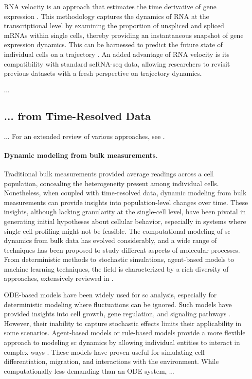 RNA velocity is an approach that estimates the time derivative of gene expression \citep{la2018rna}. This methodology captures the dynamics of RNA at the transcriptional level by examining the proportion of unspliced and spliced mRNAs within single cells, thereby providing an instantaneous snapshot of gene expression dynamics. This can be harnessed to predict the future state of individual cells on a trajectory \citep{bergen2020generalizing}. An added advantage of RNA velocity is its compatibility with standard scRNA-seq data, allowing researchers to revisit previous datasets with a fresh perspective on trajectory dynamics.

\citet{lange2022cellrank} ...

\subsection*{... from Time-Resolved Data}

...
For an extended review of various approaches, see \citet{ding2022temporal}.

\paragraph{Dynamic modeling from bulk measurements.}

Traditional bulk measurements provided average readings across a cell population, concealing the heterogeneity present among individual cells. Nonetheless, when coupled with time-resolved data, dynamic modeling from bulk measurements can provide insights into population-level changes over time. These insights, although lacking granularity at the single-cell level, have been pivotal in generating initial hypotheses about cellular behavior, especially in systems where single-cell profiling might not be feasible. The computational modeling of \acrlong{sc} dynamics from bulk data has evolved considerably, and a wide range of techniques has been proposed to study different aspects of molecular processes. From deterministic methods to stochastic simulations, agent-based models to machine learning techniques, the field is characterized by a rich diversity of approaches, extensively reviewed in \citet{klipp2016systems}.

ODE-based models have been widely used for \acrlong{sc} analysis, especially for deterministic modeling where fluctuations can be ignored. Such models have provided insights into cell growth, gene regulation, and signaling pathways \citep{busch2015fundamental, raue2015data2dynamics, tyson2003sniffers, alon2019introduction}. However, their inability to capture stochastic effects limits their applicability in some scenarios.
Agent-based models or rule-based models provide a more flexible approach to modeling \acrlong{sc} dynamics by allowing individual entities to interact in complex ways \citep{an2009agent}. These models have proven useful for simulating cell differentiation, migration, and interactions with the environment. While computationally less demanding than an ODE system, ...

